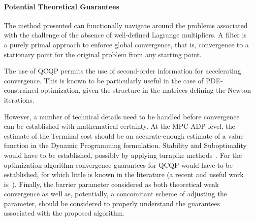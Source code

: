 \documentclass{article}
\newcommand{\1}{\mathds{1}}          %
\theoremstyle{definition}
\begin{document}
\begin{sloppypar}
\paragraph{Potential Theoretical Guarantees}

The method presented can functionally navigate around the problems associated with the challenge of the absence of well-defined Lagrange multipliers. A filter is a purely primal approach to enforce global convergence, that is, convergence to a stationary point for the original problem from any starting point. 

The use of QCQP permits the use of second-order information for accelerating convergence. This is known to be particularly useful in the case of PDE-constrained optimization, given the structure in the matrices defining the Newton iterations. 

However, a number of technical details need to be handled before convergence can be established with mathematical certainty. At the MPC-ADP level, the estimate of the Terminal cost should be an accurate-enough estimate of a value function in the Dynamic Programming formulation. Stability and Suboptimality would have to be established, possibly by applying turnpike methods~\cite{gugat2023turnpike}. For the optimization algorithm convergence guarantees for QCQP would have to be established, for which little is known in the literature (a recent and useful work is~\cite{gonzalez2025quadratic}). Finally, the barrier parameter considered as both theoretical weak convergence as well as, potentially, a concomitant scheme of adjusting the parameter, should be considered to properly understand the guarantees associated with the proposed algorithm.


\end{sloppypar}
\end{document}
